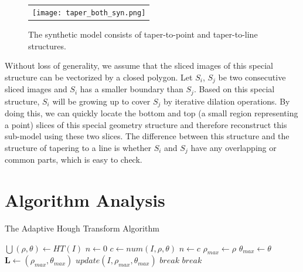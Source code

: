 \begin{figure}[htbp]
\begin{center}
\begin{tabular}{c}
\texttt{[image: taper\_both\_syn.png]}
\end{tabular}
\end{center}
\caption{ The synthetic model consists of taper-to-point and taper-to-line structures. }
\label{fig:DXF_taper_both}
\end{figure}

Without loss of generality, we assume that the sliced images of this special structure
can be vectorized by a closed polygon.
Let $S_i$, $S_j$ be two consecutive sliced images and $S_i$
has a smaller boundary than $S_j$. Based on this special structure, $S_i$ will be growing up
to cover $S_j$ by iterative dilation operations. By doing this, we can quickly locate the
bottom and top (a small region representing a point) slices of this special geometry
structure and therefore reconstruct this sub-model using these two slices.
The difference between this structure and the structure of tapering to a line is whether
$S_i$ and $S_j$ have any overlapping or common parts, which is easy to check.





\section{Algorithm Analysis}
\label{sec:PE_AA}

\begin{algorithm}
\caption{The Adaptive Hough Transform Algorithm}
\label{alg.AHT}
\begin{algorithmic}[1]
\State $\bigcup{(\rho, \theta)} \leftarrow HT (I)$  
\State $n \leftarrow 0 $
     \State $c \leftarrow num(I, \rho, \theta)$  
         \State $n \leftarrow c$
         \State $\rho_{max} \leftarrow \rho$
         \State $\theta_{max} \leftarrow \theta$
     \EndIf
\EndFor
{}   
\State $\boldsymbol{L} \leftarrow (\rho_{max}, \theta_{max})$
\State $update(I, \rho_{max}, \theta_{max})$ 
\Else
\State $break$
\EndIf
{} 
\State $break$
\EndIf
\EndWhile
\EndProcedure
\end{algorithmic}
\end{algorithm}

